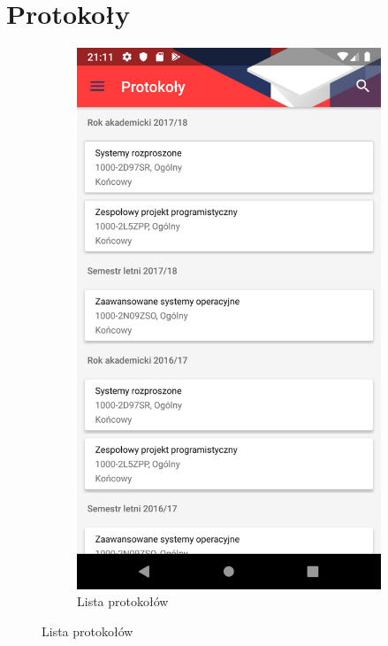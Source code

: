 \documentclass{pracamgr}
\begin{document}
\section{Protokoły}

\begin{figure}[p]
	\centering
	\begin{subfigure}[t]{0.3\textwidth}
		\includegraphics[width=\textwidth]{img/protocols_list.png}
		\caption{Lista protokołów}
		\label{fig:protocols_list}
	\end{subfigure}

\end{figure}
\end{document}
